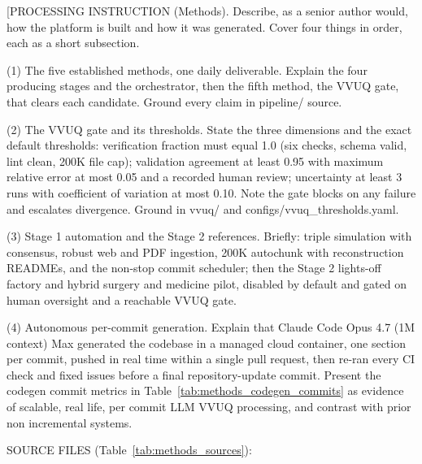 
[PROCESSING INSTRUCTION (Methods). Describe, as a senior author would,
how the platform is built and how it was generated. Cover four things in
order, each as a short subsection.

(1) The five established methods, one daily deliverable. Explain the four
producing stages and the orchestrator, then the fifth method, the VVUQ
gate, that clears each candidate. Ground every claim in pipeline/ source.

(2) The VVUQ gate and its thresholds. State the three dimensions and the
exact default thresholds: verification fraction must equal 1.0 (six
checks, schema valid, lint clean, 200K file cap); validation agreement at
least 0.95 with maximum relative error at most 0.05 and a recorded human
review; uncertainty at least 3 runs with coefficient of variation at most
0.10. Note the gate blocks on any failure and escalates divergence.
Ground in vvuq/ and configs/vvuq\_thresholds.yaml.

(3) Stage 1 automation and the Stage 2 references. Briefly: triple
simulation with consensus, robust web and PDF ingestion, 200K autochunk
with reconstruction READMEs, and the non-stop commit scheduler; then the
Stage 2 lights-off factory and hybrid surgery and medicine pilot, disabled
by default and gated on human oversight and a reachable VVUQ gate.

(4) Autonomous per-commit generation. Explain that Claude Code Opus 4.7
(1M context) Max generated the codebase in a managed cloud container, one
section per commit, pushed in real time within a single pull request, then
re-ran every CI check and fixed issues before a final repository-update
commit. Present the codegen commit metrics in
Table~\ref{tab:methods_codegen_commits} as evidence of scalable, real
life, per commit LLM VVUQ processing, and contrast with prior non
incremental systems.

SOURCE FILES (Table~\ref{tab:methods_sources}):

